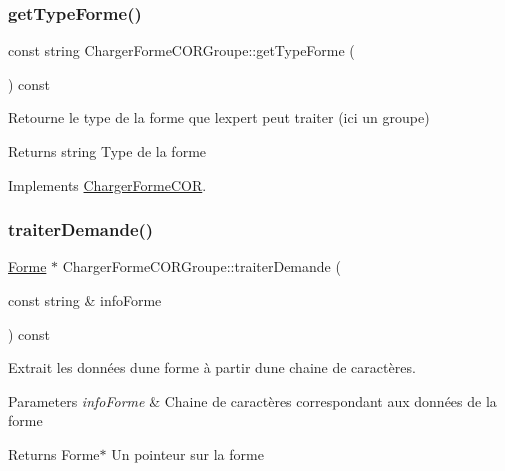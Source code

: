 \subsubsection{\texorpdfstring{get\+Type\+Forme()}{getTypeForme()}}
{\footnotesize\ttfamily const string Charger\+Forme\+C\+O\+R\+Groupe\+::get\+Type\+Forme (\begin{DoxyParamCaption}{ }\end{DoxyParamCaption}) const\hspace{0.3cm}{\ttfamily [virtual]}}



Retourne le type de la forme que l\textquotesingle{}expert peut traiter (ici un groupe) 

\begin{DoxyReturn}{Returns}
string Type de la forme 
\end{DoxyReturn}


Implements \hyperlink{class_charger_forme_c_o_r_ae740eabcd9b3cc3809c1fe5ffd0100a1}{Charger\+Forme\+C\+OR}.

\mbox{\label{class_charger_forme_c_o_r_groupe_ab28f5a9e7a8fe306c98aa3f1f8b775e4}} 
\subsubsection{\texorpdfstring{traiter\+Demande()}{traiterDemande()}}
{\footnotesize\ttfamily \hyperlink{class_forme}{Forme} $\ast$ Charger\+Forme\+C\+O\+R\+Groupe\+::traiter\+Demande (\begin{DoxyParamCaption}\item[{const string \&}]{info\+Forme }\end{DoxyParamCaption}) const\hspace{0.3cm}{\ttfamily [virtual]}}



Extrait les données d\textquotesingle{}une forme à partir d\textquotesingle{}une chaine de caractères. 


\begin{DoxyParams}{Parameters}
{\em info\+Forme} & Chaine de caractères correspondant aux données de la forme \\
\hline
\end{DoxyParams}
\begin{DoxyReturn}{Returns}
Forme$\ast$ Un pointeur sur la forme 
\end{DoxyReturn}


